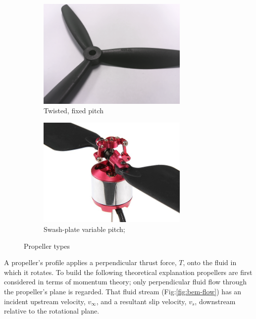 \begin{figure}[htbp]
\centering
\begin{subfigure}{0.49\textwidth}
\centering
\includegraphics[width=0.8\textwidth]{figs/fixed-pitch}
\caption{Twisted, fixed pitch}
\label{fig:fixed-pitch}
\end{subfigure}
\begin{subfigure}{0.49\textwidth}
\centering
\includegraphics[width=0.8\textwidth]{figs/variable-pitch}
\caption{Swash-plate variable pitch; \cite{variablepitch}}
\label{fig:variable-pitch}
\end{subfigure}
\caption{Propeller types}
\label{fig:props}
\vspace{-15pt}
\end{figure}
\par
A propeller's profile applies a perpendicular thrust force, $T$, onto the fluid in which it rotates. To build the following theoretical explanation propellers are first considered in terms of momentum theory; only perpendicular fluid flow through the propeller's plane is regarded. That fluid stream (Fig:\ref{fig:bem-flow}) has an incident upstream velocity, $v_\infty$, and a resultant slip velocity, $v_s$, downstream relative to the rotational plane.
